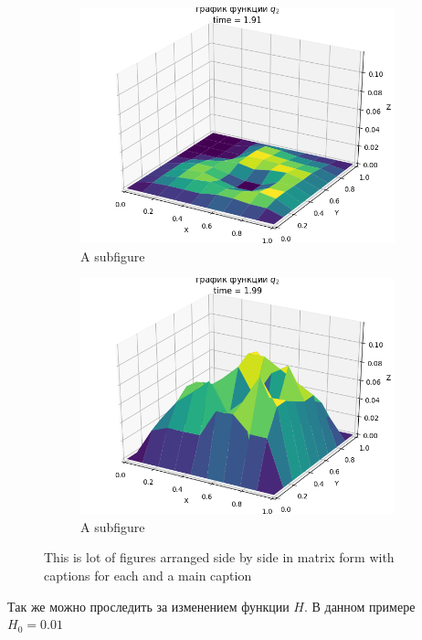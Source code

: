 \documentclass[14pt]{extreport}
\begin{document}
  
\begin{figure}[htb]
\centering
  \begin{subfigure}[b]{.24\linewidth}
    \centering
    \includegraphics[width=0.5\linewidth]{images/ex3/q_2/91}
    \caption{A subfigure}\label{img:ex3:q2:91}
  \end{subfigure}%
  \begin{subfigure}[b]{.24\linewidth}
    \centering
    \includegraphics[width=0.5\linewidth]{images/ex3/q_2/99}
    \caption{A subfigure}\label{img:ex3:q2:99}
  \end{subfigure}%

  \caption{This is   lot of figures arranged side by side in matrix form with captions for each and a main caption}\label{fig:1}
\end{figure}



Так же можно проследить за изменением функции $H$. В данном примере $H_0=0.01$
\end{document}
